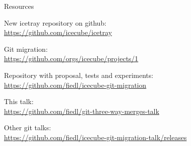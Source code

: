 
\begin{frame}{Resources}
  \begin{center}

    New icetray repository on github: \\
    \url{https://github.com/icecube/icetray}

    \vspace{1em}

    Git migration: \\
    \url{https://github.com/orgs/icecube/projects/1}

    \vspace{1em}

    Repository with proposal, tests and experiments: \\
    \url{https://github.com/fiedl/icecube-git-migration}

    \vspace{1em}

    This talk: \\
    \url{https://github.com/fiedl/git-three-way-merges-talk}

    \vspace{1em}

    Other git talks: \\
    \url{https://github.com/fiedl/icecube-git-migration-talk/releases}

  \end{center}
\end{frame}